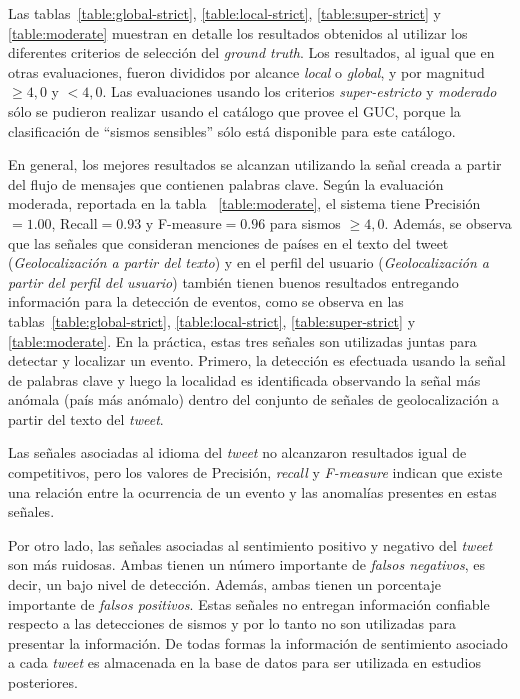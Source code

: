 Las tablas~\ref{table:global-strict}, \ref{table:local-strict}, \ref{table:super-strict} y \ref{table:moderate} muestran en detalle los resultados obtenidos al utilizar los diferentes criterios de selección del {\em ground truth}.
%
Los resultados, al igual que en otras evaluaciones, fueron divididos por alcance {\em local} o {\em global}, y por magnitud $\geq 4,0$ y $< 4,0$. Las evaluaciones usando los criterios {\em super-estricto} y {\em moderado} sólo se pudieron realizar usando el catálogo que provee el GUC, porque la clasificación de ``sismos sensibles'' sólo está disponible para este catálogo.


En general, los mejores resultados se alcanzan utilizando la señal creada a partir del flujo de mensajes que contienen palabras clave. Según la evaluación moderada, reportada en la tabla ~\ref{table:moderate}, el sistema tiene Precisión$=1.00$, Recall$=0.93$ y F-measure$=0.96$ para sismos $\geq 4,0$. 
Además, se observa que las señales que consideran menciones de países en el texto del tweet ({\em Geolocalización a partir del texto}) y en el perfil del usuario ({\em Geolocalización a partir del perfil del usuario}) también tienen buenos resultados entregando información para la detección de eventos, como se observa en las tablas~\ref{table:global-strict}, \ref{table:local-strict}, \ref{table:super-strict} y \ref{table:moderate}.
En la práctica, estas tres señales son utilizadas juntas para detectar y localizar un evento. Primero, la detección es efectuada usando la señal de palabras clave y luego la localidad es identificada observando la señal más anómala (país más anómalo) dentro del conjunto de señales de geolocalización a partir del texto del \textit{tweet}.

Las señales asociadas al idioma del \textit{tweet} no alcanzaron resultados igual de competitivos, pero los valores de Precisión, \textit{recall} y \textit{F-measure} indican que existe una relación entre la ocurrencia de un evento y las anomalías presentes en estas señales.

Por otro lado, las señales asociadas al sentimiento positivo y negativo del \textit{tweet} son más ruidosas. Ambas tienen un número importante de {\em falsos negativos}, es decir, un bajo nivel de detección. Además, ambas tienen un porcentaje importante de {\em falsos positivos}. Estas señales no entregan información confiable respecto a las detecciones de sismos y por lo tanto no son utilizadas para presentar la información. De todas formas la información de sentimiento asociado a cada {\em tweet} es almacenada en la base de datos para ser utilizada en estudios posteriores. 


